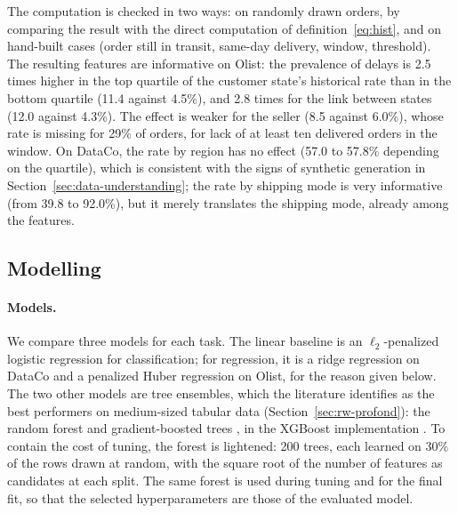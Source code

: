 \documentclass[11pt,a4paper]{article}
\theoremstyle{definition}
\begin{document}
The computation is checked in two ways: on randomly drawn orders, by comparing the result with the direct computation of definition~\eqref{eq:hist}, and on hand-built cases (order still in transit, same-day delivery, window, threshold). The resulting features are informative on Olist: the prevalence of delays is 2.5 times higher in the top quartile of the customer state's historical rate than in the bottom quartile (11.4 against 4.5\%), and 2.8 times for the link between states (12.0 against 4.3\%). The effect is weaker for the seller (8.5 against 6.0\%), whose rate is missing for 29\% of orders, for lack of at least ten delivered orders in the window. On DataCo, the rate by region has no effect (57.0 to 57.8\% depending on the quartile), which is consistent with the signs of synthetic generation in Section~\ref{sec:data-understanding}; the rate by shipping mode is very informative (from 39.8 to 92.0\%), but it merely translates the shipping mode, already among the features.

\subsection{Modelling}
\label{sec:modeling}

\paragraph{Models.} We compare three models for each task. The linear baseline is an $\ell_2$-penalized logistic regression for classification; for regression, it is a ridge regression on DataCo and a penalized Huber regression on Olist, for the reason given below. The two other models are tree ensembles, which the literature identifies as the best performers on medium-sized tabular data (Section~\ref{sec:rw-profond}): the random forest \cite{breiman2001random} and gradient-boosted trees \cite{friedman2001greedy}, in the XGBoost implementation \cite{chen2016xgboost}. To contain the cost of tuning, the forest is lightened: 200 trees, each learned on 30\% of the rows drawn at random, with the square root of the number of features as candidates at each split. The same forest is used during tuning and for the final fit, so that the selected hyperparameters are those of the evaluated model.
\end{document}
